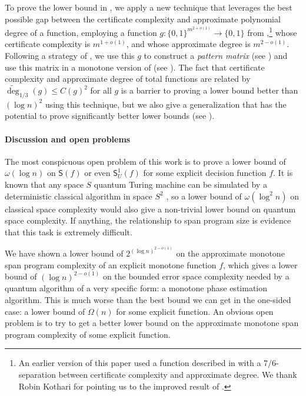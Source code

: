 \documentclass{toc}
\begin{document}
To prove the lower bound in , we apply a new technique that leverages the best possible gap between the certificate complexity and approximate polynomial degree of a function, employing a function $g:\{0,1\}^{m^{2+o(1)}}\rightarrow\{0,1\}$ from \cite{BT17},\footnote{An earlier version of this %
paper  %
used a function described in \cite{ABK16} with a $7/6$-separation between certificate complexity and approximate degree. We thank Robin Kothari for pointing us to the improved result of \cite{BT17}.} whose certificate complexity is $m^{1+o(1)}$, and whose approximate degree is $m^{2-o(1)}$. Following a strategy of \cite{RPRC16}, we use this $g$ to construct a \emph{pattern matrix} \cite{She09} (see ) and use this matrix in a monotone version of  (see ).
The fact that certificate complexity and approximate degree of total functions are related by $\widetilde{\deg}_{1/3}(g)\leq C(g)^2$ for all $g$ is a barrier to proving a lower bound better than $(\log n)^2$ using this technique, but we also give a generalization that has the potential to prove significantly better lower bounds (see ). 



\paragraph{Discussion and open problems} 
The most conspicuous open problem of this work is to prove a lower bound of $\omega(\log n)$ on $\mathsf{S}(f)$ or even $\mathsf{S}_U^1(f)$ for some explicit decision function $f$. 
It is known that any space $S$ quantum Turing machine can be simulated by a deterministic classical algorithm in space $S^2$ \cite{Wat99}, so a lower bound of $\omega(\log^2n)$ on classical space complexity would also give a non-trivial lower bound on quantum space complexity. If anything, the relationship to span program size is evidence that this task is extremely difficult. 

We have shown a lower bound of $2^{(\log n)^{2-o(1)}}$ on the approximate monotone span program complexity of an explicit monotone function $f$, which gives a lower bound of $(\log n)^{2-o(1)}$ on the bounded error space complexity needed by a quantum algorithm of a very specific form: a monotone phase estimation algorithm. 
This is much worse than the best bound we can get in the one-sided case: a lower bound of $\Omega(n)$ for some explicit function. An obvious open problem is to try to get a better lower bound on the approximate monotone span program complexity of some explicit function.
\end{document}
